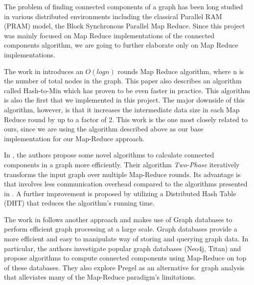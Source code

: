 The problem of finding connected components of a graph has been long studied in various distributed environments including the classical Parallel RAM (PRAM) model, the Block Synchronous Parallel Map Reduce. Since this project was mainly focused on Map Reduce implementations of the connected components algorithm, we are going to further elaborate only on Map Reduce implementations.

The work in \cite{rastogi} introduces an $O(logn)$ rounds Map Reduce algorithm, where n is the number of total nodes in the graph. This paper also describes an algorithm called Hash-to-Min which has proven to be even faster in practice. This algorithm is also the first that we implemented in this project. The major downside of this algorithm, however, is that it increases the intermediate data size in each Map Reduce round by up to a factor of 2. This work is the one most closely related to ours, since we are using the algorithm described above as our base implementation for our Map-Reduce approach.

In \cite{kiveris}, the authors propose some novel algorithms to calculate connected components in a graph more efficiently. Their algorithm \textit{Two-Phase} iteratively transforms the input graph over multiple Map-Reduce rounds. Its advantage is that involves less communication overhead compared to the algorithms presented in \cite{rastogi}. A further improvement is proposed by utilizing a Distributed Hash Table (\ie DHT) that reduces the algorithm's running time. 

The work in \cite{lim2015} follows another approach and makes use of Graph databases to perform efficient graph processing at a large scale. Graph databases provide a more efficient and easy to manipulate way of storing and querying graph data. In particular, the authors investigate popular graph databases (Neo4j, Titan) and propose algorithms to compute connected components using Map-Reduce on top of these databases. They also explore Pregel \cite{pregel} as an alternative for graph analysis that alleviates many of the Map-Reduce paradigm's limitations.
